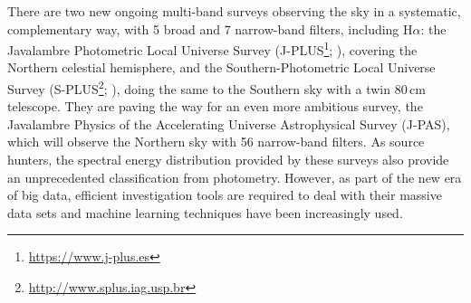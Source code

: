 \documentclass[fleqn,usenatbib]{mnras}
\begin{document}
There are two new ongoing multi-band surveys observing the sky in a systematic, complementary way, with 5 broad and 7 narrow-band filters, including H$\alpha$: the Javalambre Photometric Local Universe Survey
(J-PLUS\footnote{\url{https://www.j-plus.es}}; \citealp{Cenarro:2018}), covering the Northern celestial hemisphere, and the Southern-Photometric Local Universe Survey
(S-PLUS\footnote{\url{http://www.splus.iag.usp.br}}; \citealp{Mendes:2019}), doing the same to the Southern sky with a twin 80\,cm telescope. They are paving the way for an even more ambitious survey, the Javalambre Physics of the Accelerating Universe Astrophysical Survey (J-PAS), which will observe the Northern sky with 56 narrow-band filters. As source hunters, the spectral energy distribution provided by these surveys also provide an unprecedented classification from photometry. However, as part of the new era of big data, efficient investigation tools are required to deal with their massive data sets and machine learning techniques have been increasingly used.



\end{document}
